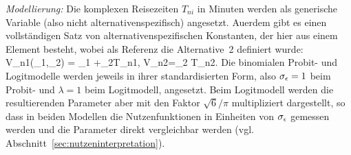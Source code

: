 \emph{Modellierung:}
Die komplexen Reisezeiten $T_{ni}$ in Minuten werden als generische
Variable (also nicht 
alternativenspezifisch) angesetzt. Au\3erdem gibt es einen
vollst\"andigen Satz von alternativenspezifischen Konstanten, der hier
aus einem Element besteht, wobei als Referenz die
Alternative~2 definiert wurde: 
\be 
\label{binomBeisp1}
V_{n1}(\beta_1,\beta_2) = \beta_1 +\beta_2T_{n1}, \quad 
V_{n2}=\beta_2 T_{n2}.
\ee
Die binomialen Probit- und Logitmodelle werden jeweils in ihrer
standardisierten Form, also $\sigma_{\epsilon}=1$ beim Probit- und $\lambda=1$
beim Logitmodell, angesetzt. Beim Logitmodell werden die
resultierenden Parameter aber mit den Faktor $\sqrt{6}/\pi$
multipliziert dargestellt, so dass in beiden Modellen die
Nutzenfunktionen in Einheiten von $\sigma_{\epsilon}$ gemessen werden und die
Parameter direkt vergleichbar werden (vgl. Abschnitt~\ref{sec:nutzeninterpretation}).

